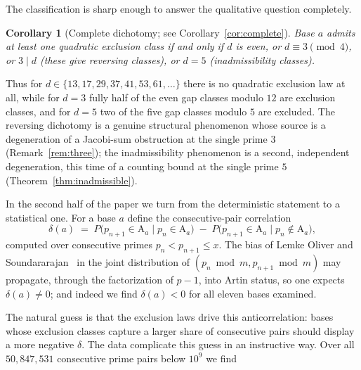 \documentclass[11pt,reqno]{amsart}
\theoremstyle{plain}
\newtheorem{corollary}[theorem]{Corollary}
\theoremstyle{definition}
\newcommand{\Art}{\mathrm{A}}
\begin{document}
The classification is sharp enough to answer the qualitative question
completely.

\begin{corollary}[Complete dichotomy; see Corollary~\ref{cor:complete}]
Base $a$ admits at least one quadratic exclusion class if and only if $d$ is
even, or $d \equiv 3 \pmod 4$, or $3 \mid d$ (these give reversing classes), or
$d = 5$ (inadmissibility classes).
\end{corollary}

Thus for $d \in \{13, 17, 29, 37, 41, 53, 61, \dots\}$ there is no quadratic
exclusion law at all, while for $d = 3$ fully half of the even gap classes
modulo $12$ are exclusion classes, and for $d = 5$ two of the five
gap classes modulo $5$ are excluded. The reversing dichotomy is a genuine
structural phenomenon whose source is a degeneration of a Jacobi-sum
obstruction at the single prime $3$ (Remark~\ref{rem:three}); the
inadmissibility phenomenon is a second, independent degeneration, this time of
a counting bound at the single prime $5$
(Theorem~\ref{thm:inadmissible}).

In the second half of the paper we turn from the deterministic statement to a
statistical one. For a base $a$ define the consecutive-pair correlation
\begin{equation}
\label{eq:delta}
  \delta(a) \;=\; P\bigl(p_{n+1} \in \Art_a \mid p_n \in \Art_a\bigr)
             \;-\; P\bigl(p_{n+1} \in \Art_a \mid p_n \notin \Art_a\bigr),
\end{equation}
computed over consecutive primes $p_n < p_{n+1} \le x$. The bias of
Lemke Oliver and Soundararajan~\cite{LOS2016} in the joint distribution of
$(p_n \bmod m, p_{n+1} \bmod m)$ may propagate, through the factorization of
$p - 1$, into Artin status, so one expects $\delta(a) \neq 0$; and indeed we
find $\delta(a) < 0$ for all eleven bases examined.

The natural guess is that the exclusion laws drive this anticorrelation: bases
whose exclusion classes capture a larger share of consecutive pairs should
display a more negative $\delta$. The data complicate this guess in an
instructive way. Over all $50{,}847{,}531$ consecutive prime pairs below
$10^9$ we find
\end{document}
